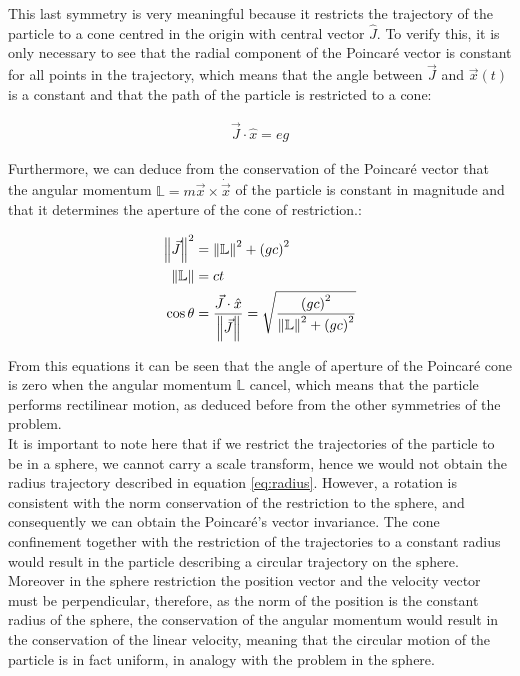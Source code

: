 This last symmetry is very meaningful because it restricts the trajectory of the particle to a cone centred in the origin with central vector $\hat{J}$. To verify this, it is only necessary to see that the radial component of the Poincar\'e vector is constant for all points in the trajectory, which means that the angle between $\vec{J}$ and $\vec{x}(t)$ is a constant and that the path of the particle is restricted to a cone:

\begin{align*}
\vec{J}\cdot\hat{x} = eg
\end{align*}

Furthermore, we can deduce from the conservation of the Poincar\'e vector that the angular momentum $\mathbb{L}= m\vec{x}\times\dot{\vec{x}}$ of the particle is constant in magnitude and that it determines the aperture of the cone of restriction.:

\begin{equation}
\begin{aligned}
\left\lVert \vec{J} \right\rVert^2 &= \left\lVert \mathbb{L} \right\rVert^2 +\left( gc \right)^2\\
\left\lVert \mathbb{L} \right\rVert &= ct\\
\cos{\theta} &= \frac{\vec{J}\cdot\hat{x}}{\left\lVert \vec{J} \right\rVert} = \sqrt{\frac{\left( gc \right)^2}{\left\lVert \mathbb{L} \right\rVert^2 +\left( gc \right)^2}}
\end{aligned}
\label{eq:poincarecone}
\end{equation}


From this equations it can be seen that the angle of aperture of the Poincar\'e cone is zero when the angular momentum $\mathbb{L}$ cancel, which means that the particle performs rectilinear motion, as deduced before from the other symmetries of the problem.\\

It is important to note here that if we restrict the trajectories of the particle to be in a sphere, we cannot carry a scale transform, hence we would not obtain the radius trajectory described in equation \eqref{eq:radius}. However, a rotation is consistent with the norm conservation of the restriction to the sphere, and consequently we can obtain the Poincar\'e's vector invariance. The cone confinement together with the restriction of the trajectories to a constant radius would result in the particle describing a circular trajectory on the sphere.\\ 

Moreover in the sphere restriction the position vector and the velocity vector must be perpendicular, therefore, as the norm of the position is the constant radius of the sphere, the conservation of the angular momentum would result in the conservation of the linear velocity, meaning that the circular motion of the particle is in fact uniform, in analogy with the problem in the sphere.\\

